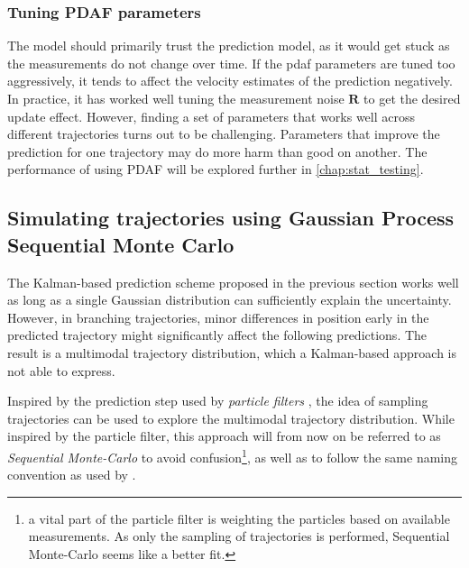 \subsubsection{Tuning PDAF parameters}
The model should primarily trust the prediction model, as it would get stuck as the measurements do not change over time. If the \acrshort{pdaf} parameters are tuned too aggressively, it tends to affect the velocity estimates of the prediction negatively. In practice, it has worked well tuning the measurement noise $\boldsymbol{R}$ to get the desired update effect.
However, finding a set of parameters that works well across different trajectories turns out to be challenging. Parameters that improve the prediction for one trajectory may do more harm than good on another. The performance of using PDAF will be explored further in \cref{chap:stat_testing}.

\subsection{Simulating trajectories using Gaussian Process Sequential Monte Carlo}\label{sec:dyngp_particle}
The Kalman-based prediction scheme proposed in the previous section works well as long as a single Gaussian distribution can sufficiently explain the uncertainty. However, in branching trajectories, minor differences in position early in the predicted trajectory might significantly affect the following predictions. The result is a multimodal trajectory distribution, which a Kalman-based approach is not able to express.

Inspired by the prediction step used by \textit{particle filters} \cite{sensorfusjon}, the idea of sampling trajectories can be used to explore the multimodal trajectory distribution. While inspired by the particle filter, this approach will from now on be referred to as \textit{Sequential Monte-Carlo} to avoid confusion\footnote{a vital part of the particle filter is weighting the particles based on available measurements. As only the sampling of trajectories is performed, Sequential Monte-Carlo seems like a better fit.}, as well as to follow the same naming convention as used by \citeauthor{pedestrian} \cite{pedestrian}.

